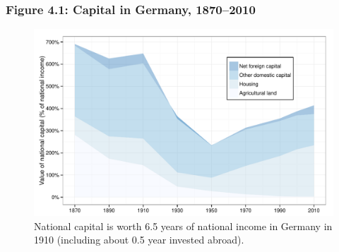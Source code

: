 \documentclass[t]{beamer}\usepackage[]{graphicx}\usepackage[]{color}
\newenvironment{knitrout}{}{} %
\begin{document}
\begin{frame}[label=Figure_4_1]
\frametitle{Figure 4.1: Capital in Germany, 1870--2010}
\begin{figure}[t]
\begin{minipage}[b]{\textwidth}
\centering
\begin{knitrout}\footnotesize
{}\color{fgcolor}

{\centering \includegraphics[width=1\linewidth]{figures/color/Figure_4_1} 

}



\end{knitrout}
\caption{National capital is worth 6.5 years of national income in Germany in 1910 (including about 0.5 year invested abroad).}
\end{minipage}
\end{figure}
\end{frame}
\end{document}
